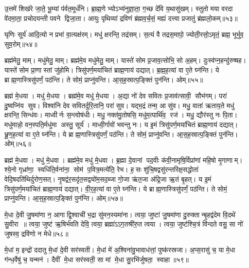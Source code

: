 उ॒त्तमे॑ शिख॑रे जा॒ते॒ भू॒म्यां प॑र्वत॒मूर्ध॑नि। ब्रा॒ह्म॒णेभ्योऽभ्य॑नुज्ञा॒ता॒ ग॒च्छ दे॑वि य॒थासु॑खम्। स्तुतो मया वरदा वे॑दमा॒ता॒ प्रचोदयन्ती पवने द्विजा॒ता। आयुः पृथिव्यां द्रविणं ब्र॑ह्मव॒र्च॒सं॒ मह्यं दत्त्वा प्रजातुं ब्र॑ह्मलो॒कम्॥५३॥
\anuvakamend

घृणिः सूर्य॑ आदि॒त्यो न प्रभा॑ वा॒त्यक्ष॑रम्। मधु॑ क्षरन्ति॒ तद्र॑सम्। स॒त्यं वै तद्रस॒मापो॒ ज्योती॒रसो॒ऽमृतं॒ ब्रह्म॒ भूर्भुव॒ सुव॒रोम्॥५४॥\anuvakamend

ब्रह्म॑मेतु॒ माम्। मधु॑मेतु॒ माम्। ब्रह्म॑मे॒व मधु॑मेतु॒ माम्। यास्ते॑ सोम प्र॒जाव॒त्सोभि॒ सो अ॒हम्। दुःस्व॑प्न॒हन्दु॑रुष्षह। यास्ते॑ सोम प्रा॒णास्तां जु॑होमि। त्रिसु॑पर्ण॒मया॑चितं ब्राह्म॒णाय॑ दद्यात्। ब्र॒ह्म॒ह॒त्यां वा ए॒ते घ्न॑न्ति। ये ब्राह्म॒णास्त्रिसु॑पर्णं॒ पठ॑न्ति। ते सोमं॒ प्राप्नु॑वन्ति। आ॒स॒ह॒स्रात्प॒ङ्क्तिं पुन॑न्ति। ओम्॥५५॥
\anuvakamend

ब्रह्म॑ मे॒धया। मधु॑ मे॒धया। ब्रह्म॑मे॒व मधु॑ मे॒धया। अ॒द्या नो॑ देव सवितः प्र॒जाव॑त्सावी॒ सौभ॑गम्। परा॑ दु॒ष्वप्नि॑य सुव। विश्वा॑नि देव सवितर्दुरि॒तानि॒ परा॑ सुव। यद्भ॒द्रं तन्म॒ आ सु॑व। मधु॒ वाता॑ ऋताय॒ते मधु॑ क्षरन्ति॒ सिन्ध॑वः। माध्वीर्नः स॒न्त्वोष॑धीः। मधु॒ नक्त॑मु॒तोषसि॒ मधु॑म॒त्पार्थि॑व॒ रज॑। मधु॒ द्यौर॑स्तु नः पि॒ता। मधु॑मान्नो॒ वन॒स्पति॒र्मधु॑मा अस्तु॒ सूर्य॑। माध्वी॒र्गावो॑ भवन्तु नः। य इ॒मं त्रिसु॑पर्ण॒मया॑चितं ब्राह्म॒णाय॑ दद्यात्। भ्रू॒ण॒ह॒त्यां वा ए॒ते घ्न॑न्ति। ये ब्राह्म॒णास्त्रिसु॑पर्णं॒ पठ॑न्ति। ते सोमं॒ प्राप्नु॑वन्ति। आ॒स॒ह॒स्रात्प॒ङ्क्तिं पुन॑न्ति। ओम्॥५६॥
\anuvakamend


ब्रह्म॑ मे॒धवा। मधु॑ मे॒धवा। ब्रह्म॑मे॒व मधु॑ मे॒धवा। ब्र॒ह्मा दे॒वानां पद॒वीः क॑वी॒नामृषि॒र्विप्रा॑णां महि॒षो मृ॒गाणाम्। श्ये॒नो गृध्रा॑णा॒ स्वधि॑ति॒र्वना॑ना॒ सोम॑ प॒वित्र॒मत्ये॑ति॒ रेभ\sn{}। ह॒सः शु॑चि॒षद्वसु॑रन्तरिक्ष॒सद्धोता॑ वेदि॒षदति॑थिर्दुरोण॒सत्। नृ॒षद्व॑र॒सदृ॑त॒सद्व्यो॑म॒सद॒ब्जा गो॒जा ऋ॑त॒जा अ॑द्रि॒जा ऋ॒तं बृ॒हत्। य इ॒मं त्रिसु॑पर्ण॒मया॑चितं ब्राह्म॒णाय॑ दद्यात्। वी॒र॒ह॒त्यां वा ए॒ते घ्न॑न्ति। ये ब्राह्म॒णास्त्रिसु॑पर्णं॒ पठ॑न्ति। ते सोमं॒ प्राप्नु॑वन्ति। आ॒स॒ह॒स्रात्प॒ङ्क्तिं पुन॑न्ति। ओम्॥५७॥
\anuvakamend

मे॒धा दे॒वी जु॒षमा॑णा न॒ आगाद्वि॒श्वाची॑ भ॒द्रा सु॑मन॒स्यमा॑ना। त्वया॒ जुष्टा॑ जु॒षमा॑णा दु॒रुक्तान्बृ॒हद्व॑देम वि॒दथे॑ सु॒वीरा॥ त्वया॒ जुष्ट॑ ऋ॒षिर्भ॑वति देवि॒ त्वया॒ ब्रह्मा॑ऽऽग॒तश्री॑रु॒त त्वया। त्वया॒ जुष्ट॑श्चि॒त्रं वि॑न्दते वसु॒ सा नो॑ जुषस्व॒ द्रवि॑णो न मेधे॥५८॥
\anuvakamend


मे॒धां म॒ इन्द्रो॑ ददातु मे॒धां दे॒वी सर॑स्वती। मे॒धां मे॑ अ॒श्विना॑वु॒भावाध॑त्तां॒ पुष्क॑रस्रजा। अ॒प्स॒रासु॑ च॒ या मे॒धा ग॑न्ध॒र्वेषु॑ च॒ यन्मन॑। दैवीं मे॒धा सर॑स्वती॒ सा मां मे॒धा सु॒रभि॑र्जुषता॒ स्वाहा॥५९॥
\anuvakamend


